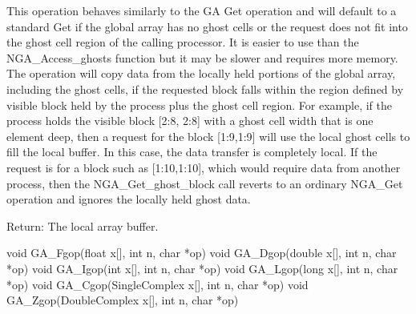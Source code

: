 \documentclass[12pt]{article}
\begin{document}
\ncoll

\begin{desc}

This operation behaves similarly to the GA Get operation and will default to
a standard Get if the global array has no ghost cells or the request does not
fit into the ghost cell region of the calling processor. It is easier to use
than the NGA_Access_ghosts function but it may be slower and requires more
memory. The operation will copy data from the locally held portions of the global
array, including the ghost cells, if the requested block falls within the region
defined by visible block held by the process plus the ghost cell region. For
example, if the process holds the visible block [2:8, 2:8] with a ghost cell
width that is one element deep, then a request for the block [1:9,1:9] will use
the local ghost cells to fill the local buffer. In this case, the data transfer
is completely local. If the request is for a block such as [1:10,1:10], which
would require data from another process, then the NGA_Get_ghost_block call
reverts to an ordinary NGA_Get operation and ignores the locally held ghost
data.

Return: The local array buffer.
\end{desc}



\begin{capi}
\begin{ccode}
void GA_Fgop(float x[], int n, char *op)
void GA_Dgop(double x[], int n, char *op)
void GA_Igop(int x[], int n, char *op)
void GA_Lgop(long x[], int n, char *op)
void GA_Cgop(SingleComplex x[], int n, char *op)
void GA_Zgop(DoubleComplex x[], int n, char *op)
\end{ccode}
\begin{funcargs}
\end{funcargs}
\end{capi}
\end{document}

